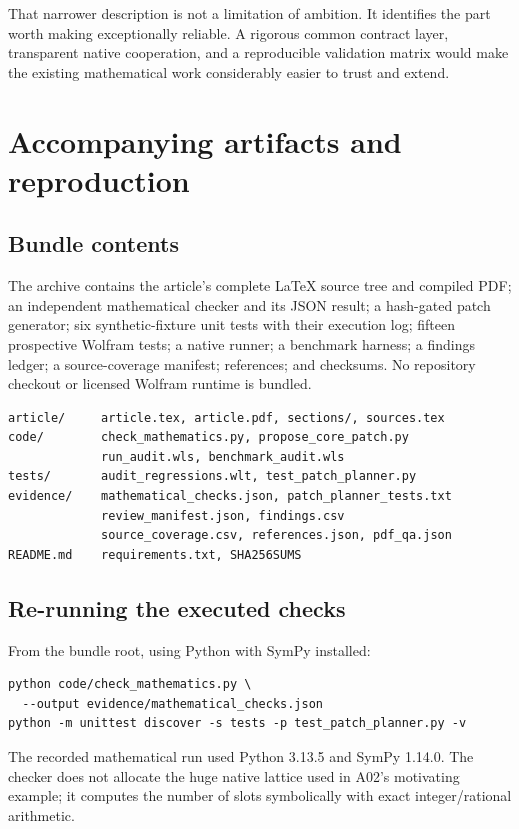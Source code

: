 \documentclass[11pt,a4paper]{article}
\theoremstyle{remark}\newtheorem{remark}[proposition]{Remark}
\begin{document}
That narrower description is not a limitation of ambition. It identifies the part worth making exceptionally reliable. A rigorous common contract layer, transparent native cooperation, and a reproducible validation matrix would make the existing mathematical work considerably easier to trust and extend.



\section{Accompanying artifacts and reproduction}
\subsection{Bundle contents}
The archive contains the article's complete LaTeX source tree and compiled PDF; an independent mathematical checker and its JSON result; a hash-gated patch generator; six synthetic-fixture unit tests with their execution log; fifteen prospective Wolfram tests; a native runner; a benchmark harness; a findings ledger; a source-coverage manifest; references; and checksums. No repository checkout or licensed Wolfram runtime is bundled.

\begin{lstlisting}
article/     article.tex, article.pdf, sections/, sources.tex
code/        check_mathematics.py, propose_core_patch.py
             run_audit.wls, benchmark_audit.wls
tests/       audit_regressions.wlt, test_patch_planner.py
evidence/    mathematical_checks.json, patch_planner_tests.txt
             review_manifest.json, findings.csv
             source_coverage.csv, references.json, pdf_qa.json
README.md    requirements.txt, SHA256SUMS
\end{lstlisting}

\subsection{Re-running the executed checks}
From the bundle root, using Python with SymPy installed:
\begin{lstlisting}
python code/check_mathematics.py \
  --output evidence/mathematical_checks.json
python -m unittest discover -s tests -p test_patch_planner.py -v
\end{lstlisting}
The recorded mathematical run used Python 3.13.5 and SymPy 1.14.0. The checker does not allocate the huge native lattice used in A02's motivating example; it computes the number of slots symbolically with exact integer/rational arithmetic.
\end{document}
